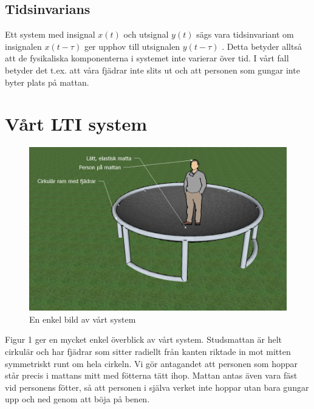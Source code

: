 \documentclass[10pt,a4paper]{article}
\begin{document}

\subsection{Tidsinvarians}

Ett system med insignal $x(t)$ och utsignal $y(t)$ sägs vara tidsinvariant om insignalen $x(t - \tau)$ ger upphov till utsignalen $y(t - \tau)$ \cite{sune2000}. Detta betyder alltså att de fysikaliska komponenterna i systemet inte varierar över tid. I vårt fall betyder det t.ex. att våra fjädrar inte slits ut och att personen som gungar inte byter plats på mattan. 

\newpage
\section{Vårt LTI system}
\begin{figure}[ht]
\begin{center}
\includegraphics[scale=0.62]{Bild2}
\caption{En enkel bild av vårt system}
\end{center}
\end{figure}

Figur 1 ger en mycket enkel överblick av vårt system. Studsmattan är helt cirkulär och har fjädrar som sitter radiellt från kanten riktade in mot mitten symmetriskt runt om hela cirkeln. Vi gör antagandet att personen som hoppar står precis i mattans mitt med fötterna tätt ihop. Mattan antas även vara fäst vid personens fötter, så att personen i själva verket inte hoppar utan bara gungar upp och ned genom att böja på benen.
\end{document}
